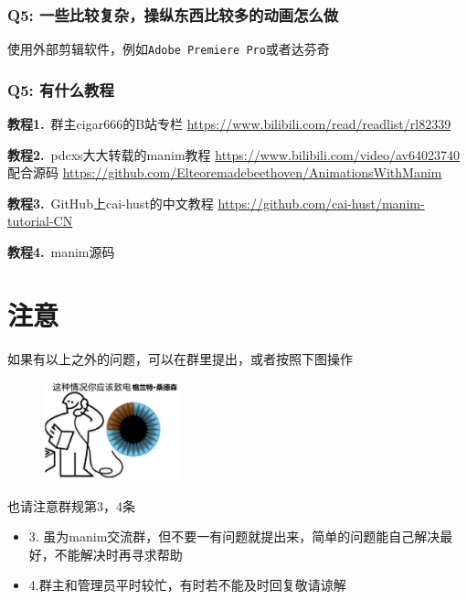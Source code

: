 \documentclass[UTF8]{ctexart}
\begin{document}
\subsubsection*{Q5: 一些比较复杂，操纵东西比较多的动画怎么做}
使用外部剪辑软件，例如\texttt{Adobe Premiere Pro}或者达芬奇

\subsubsection*{Q5: 有什么教程}
\textbf{教程1.}\ 群主cigar666的B站专栏
\url{https://www.bilibili.com/read/readlist/rl82339}

\textbf{教程2.}\ pdcxs大大转载的manim教程
\url{https://www.bilibili.com/video/av64023740}配合源码
\url{https://github.com/Elteoremadebeethoven/AnimationsWithManim}

\textbf{教程3.}\ GitHub上cai-hust的中文教程
\url{https://github.com/cai-hust/manim-tutorial-CN}

\textbf{教程4.}\ manim源码

\section{注意}
如果有以上之外的问题，可以在群里提出，或者按照下图操作
\begin{figure}[h]
\centering
\includegraphics[width=0.35\textwidth]{Grant.png}
\end{figure}

也请注意群规第3，4条
\begin{itemize}
	\item 3. 虽为manim交流群，但不要一有问题就提出来，简单的问题能自己解决最好，不能解决时再寻求帮助
	\item 4.群主和管理员平时较忙，有时若不能及时回复敬请谅解
\end{itemize}
\end{document}

